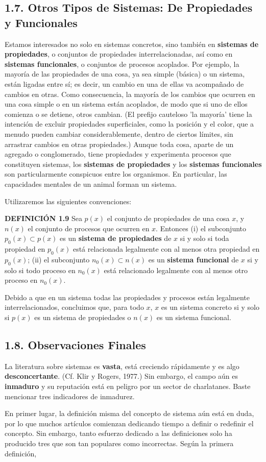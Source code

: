 {\fontsize{13}{15}\selectfont
\subsection*{1.7. Otros Tipos de Sistemas: De Propiedades y Funcionales}
Estamos interesados no solo en sistemas concretos, sino también en \textbf{sistemas de propiedades}, o conjuntos de propiedades interrelacionadas, así como en \textbf{sistemas funcionales}, o conjuntos de procesos acoplados. Por ejemplo, la mayoría de las propiedades de una cosa, ya sea simple (básica) o un sistema, están ligadas entre sí; es decir, un cambio en una de ellas va acompañado de cambios en otras. Como consecuencia, la mayoría de los cambios que ocurren en una cosa simple o en un sistema están acoplados, de modo que si uno de ellos comienza o se detiene, otros cambian. (El prefijo cauteloso 'la mayoría' tiene la intención de excluir propiedades superficiales, como la posición y el color, que a menudo pueden cambiar considerablemente, dentro de ciertos límites, sin arrastrar cambios en otras propiedades.) Aunque toda cosa, aparte de un agregado o conglomerado, tiene propiedades y experimenta procesos que constituyen sistemas, los \textbf{sistemas de propiedades} y los \textbf{sistemas funcionales} son particularmente conspicuos entre los organismos. En particular, las capacidades mentales de un animal forman un sistema.

Utilizaremos las siguientes convenciones:

\textbf{DEFINICIÓN 1.9} Sea $p(x)$ el conjunto de propiedades de una cosa $x$, y $n(x)$ el conjunto de procesos que ocurren en $x$. Entonces
(i) el subconjunto $p_0(x) \subset p(x)$ es un \textbf{sistema de propiedades} de $x$ si y solo si toda propiedad en $p_0(x)$ está relacionada legalmente con al menos otra propiedad en $p_0(x)$;
(ii) el subconjunto $n_0(x) \subset n(x)$ es un \textbf{sistema funcional} de $x$ si y solo si todo proceso en $n_0(x)$ está relacionado legalmente con al menos otro proceso en $n_0(x)$.

Debido a que en un sistema todas las propiedades y procesos están legalmente interrelacionados, concluimos que, para todo $x$, $x$ es un sistema concreto si y solo si $p(x)$ es un sistema de propiedades o $n(x)$ es un sistema funcional.

\subsection*{1.8. Observaciones Finales}
La literatura sobre sistemas es \textbf{vasta}, está creciendo rápidamente y es algo \textbf{desconcertante}. (Cf. Klir y Rogers, 1977.) Sin embargo, el campo aún es \textbf{inmaduro} y su reputación está en peligro por un sector de charlatanes. Baste mencionar tres indicadores de inmadurez.

En primer lugar, la definición misma del concepto de sistema aún está en duda, por lo que muchos artículos comienzan dedicando tiempo a definir o redefinir el concepto. Sin embargo, tanto esfuerzo dedicado a las definiciones solo ha producido tres que son tan populares como incorrectas. Según la primera definición,
}
